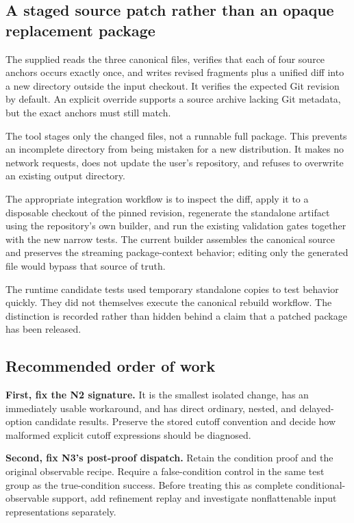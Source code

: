 \documentclass[11pt,letterpaper]{article}
\newcommand{\file}[1]{\path{#1}}
\begin{document}
\subsection{A staged source patch rather than an opaque replacement package}

The supplied \file{code/candidate_patch.py} reads the three canonical files, verifies that each of four source anchors occurs exactly once, and writes revised fragments plus a unified diff into a new directory outside the input checkout. It verifies the expected Git revision by default. An explicit override supports a source archive lacking Git metadata, but the exact anchors must still match.

The tool stages only the changed files, not a runnable full package. This prevents an incomplete directory from being mistaken for a new distribution. It makes no network requests, does not update the user's repository, and refuses to overwrite an existing output directory.

The appropriate integration workflow is to inspect the diff, apply it to a disposable checkout of the pinned revision, regenerate the standalone artifact using the repository's own builder, and run the existing validation gates together with the new narrow tests. The current builder assembles the canonical source and preserves the streaming package-context behavior; editing only the generated file would bypass that source of truth.\cite{builder}

The runtime candidate tests used temporary standalone copies to test behavior quickly. They did not themselves execute the canonical rebuild workflow. The distinction is recorded rather than hidden behind a claim that a patched package has been released.

\subsection{Recommended order of work}

\textbf{First, fix the N2 signature.} It is the smallest isolated change, has an immediately usable workaround, and has direct ordinary, nested, and delayed-option candidate results. Preserve the stored cutoff convention and decide how malformed explicit cutoff expressions should be diagnosed.

\textbf{Second, fix N3's post-proof dispatch.} Retain the condition proof and the original observable recipe. Require a false-condition control in the same test group as the true-condition success. Before treating this as complete conditional-observable support, add refinement replay and investigate nonflattenable input representations separately.
\end{document}
